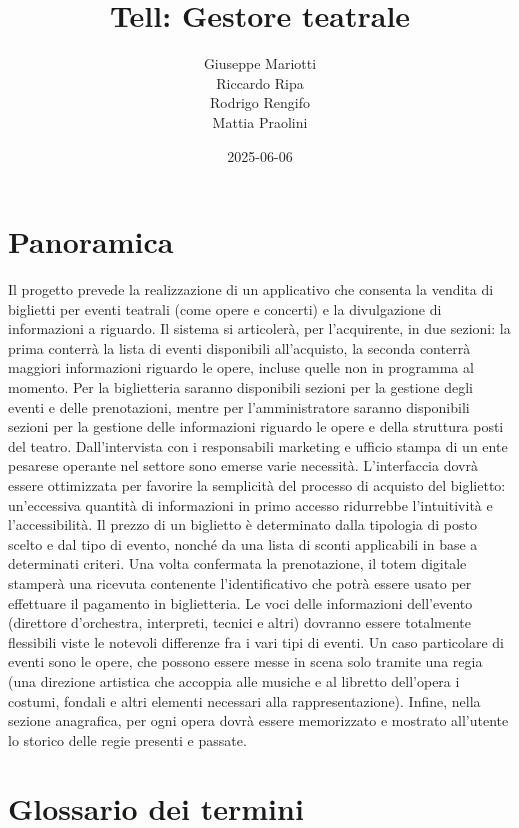 \documentclass{article}
\title{Tell: Gestore teatrale}
\date{2025-06-06}
\author
{
    Giuseppe Mariotti\\
    Riccardo Ripa\\
    Rodrigo Rengifo\\
    Mattia Praolini
}
\begin{document}
    \maketitle
    \newpage

    \section{Panoramica}
        Il progetto prevede la realizzazione di un applicativo che consenta la vendita di biglietti per eventi teatrali (come opere e concerti) e la divulgazione di informazioni a riguardo. Il sistema si articolerà, per l’acquirente, in due sezioni: la prima conterrà la lista di eventi disponibili all'acquisto, la seconda conterrà maggiori informazioni riguardo le opere, incluse quelle non in programma al momento. Per la biglietteria saranno disponibili sezioni per la gestione degli eventi e delle prenotazioni, mentre per l'amministratore saranno disponibili sezioni per la gestione delle informazioni riguardo le opere e della struttura posti del teatro. Dall’intervista con i responsabili marketing e ufficio stampa di un ente pesarese operante nel settore sono emerse varie necessità. L’interfaccia dovrà essere ottimizzata per favorire la semplicità del processo di acquisto del biglietto: un’eccessiva quantità di informazioni in primo accesso ridurrebbe l’intuitività e l’accessibilità. Il prezzo di un biglietto è determinato dalla tipologia di posto scelto e dal tipo di evento, nonché da una lista di sconti applicabili in base a determinati criteri. Una volta confermata la prenotazione, il totem digitale stamperà una ricevuta contenente l'identificativo che potrà essere usato per effettuare il pagamento in biglietteria. Le voci delle informazioni dell’evento (direttore d’orchestra, interpreti, tecnici e altri) dovranno essere totalmente flessibili viste le notevoli differenze fra i vari tipi di eventi. Un caso particolare di eventi sono le opere, che possono essere messe in scena solo tramite una regia (una direzione artistica che accoppia alle musiche e al libretto dell’opera i costumi, fondali e altri elementi necessari alla rappresentazione). Infine, nella sezione anagrafica, per ogni opera dovrà essere memorizzato e mostrato all’utente lo storico delle regie presenti e passate.
    \newpage

    \section{Glossario dei termini}
\end{document}

